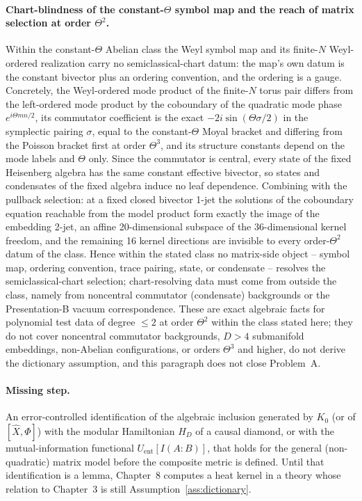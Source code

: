 \paragraph{Chart-blindness of the constant-\(\Theta\) symbol map and the reach of matrix selection at order \(\Theta^2\).} Within the constant-\(\Theta\) Abelian class the Weyl symbol map and its finite-\(N\) Weyl-ordered realization carry no semiclassical-chart datum: the map's own datum is the constant bivector plus an ordering convention, and the ordering is a gauge. Concretely, the Weyl-ordered mode product of the finite-\(N\) torus pair differs from the left-ordered mode product by the coboundary of the quadratic mode phase \(e^{i\Theta m n/2}\), its commutator coefficient is the exact \(-2i\sin(\Theta\sigma/2)\) in the symplectic pairing \(\sigma\), equal to the constant-\(\Theta\) Moyal bracket and differing from the Poisson bracket first at order \(\Theta^3\), and its structure constants depend on the mode labels and \(\Theta\) only. Since the commutator is central, every state of the fixed Heisenberg algebra has the same constant effective bivector, so states and condensates of the fixed algebra induce no leaf dependence. Combining with the pullback selection: at a fixed closed bivector 1-jet the solutions of the coboundary equation reachable from the model product form exactly the image of the embedding 2-jet, an affine 20-dimensional subspace of the 36-dimensional kernel freedom, and the remaining 16 kernel directions are invisible to every order-\(\Theta^2\) datum of the class. Hence within the stated class no matrix-side object -- symbol map, ordering convention, trace pairing, state, or condensate -- resolves the semiclassical-chart selection; chart-resolving data must come from outside the class, namely from noncentral commutator (condensate) backgrounds or the Presentation-B vacuum correspondence. These are exact algebraic facts for polynomial test data of degree \(\le 2\) at order \(\Theta^2\) within the class stated here; they do not cover noncentral commutator backgrounds, \(D>4\) submanifold embeddings, non-Abelian configurations, or orders \(\Theta^3\) and higher, do not derive the dictionary assumption, and this paragraph does not close Problem~A.

\paragraph{Missing step.}
An error-controlled identification of the algebraic inclusion generated
by \(K_0\) (or of \([\hat X,\Phi]\)) with the modular Hamiltonian \(H_D\)
of a causal diamond, or with the mutual-information functional
\(U_{\mathrm{ent}}[I(A:B)]\), that holds for the general (non-quadratic)
matrix model before the composite metric is defined. Until that
identification is a lemma, Chapter~8 computes a heat kernel in a theory
whose relation to Chapter~3 is still Assumption~\ref{ass:dictionary}.

